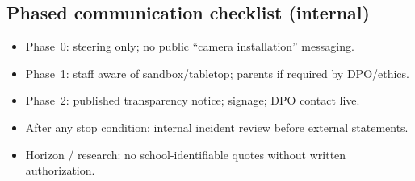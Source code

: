 \subsection{Phased communication checklist (internal)}

\begin{itemize}[noitemsep]
  \item Phase~0: steering only; no public ``camera installation'' messaging.
  \item Phase~1: staff aware of sandbox/tabletop; parents if required by DPO/ethics.
  \item Phase~2: published transparency notice; signage; DPO contact live.
  \item After any stop condition: internal incident review before external statements.
  \item Horizon / research: no school-identifiable quotes without written authorization.
\end{itemize}
